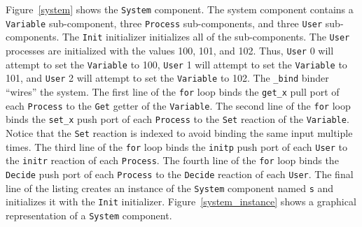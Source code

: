 Figure~\ref{system} shows the \verb+System+ component.
The system component contains a \verb+Variable+ sub-component, three \verb+Process+ sub-components, and three \verb+User+ sub-components.
The \verb+Init+ initializer initializes all of the sub-components.
The \verb+User+ processes are initialized with the values 100, 101, and 102.
Thus, \verb+User+ 0 will attempt to set the \verb+Variable+ to 100, \verb+User+ 1 will attempt to set the \verb+Variable+ to 101, and \verb+User+ 2 will attempt to set the \verb+Variable+ to 102.
The \verb+_bind+ binder ``wires'' the system.
The first line of the \verb+for+ loop binds the \verb+get_x+ pull port of each \verb+Process+ to the \verb+Get+ getter of the \verb+Variable+.
The second line of the \verb+for+ loop binds the \verb+set_x+ push port of each \verb+Process+ to the \verb+Set+ reaction of the \verb+Variable+.
Notice that the \verb+Set+ reaction is indexed to avoid binding the same input multiple times.
The third line of the \verb+for+ loop binds the \verb+initp+ push port of each \verb+User+ to the \verb+initr+ reaction of each \verb+Process+.
The fourth line of the \verb+for+ loop binds the \verb+Decide+ push port of each \verb+Process+ to the \verb+Decide+ reaction of each \verb+User+.
The final line of the listing creates an instance of the \verb+System+ component named \verb+s+ and initializes it with the \verb+Init+ initializer.
Figure~\ref{system_instance} shows a graphical representation of a \verb+System+ component.

